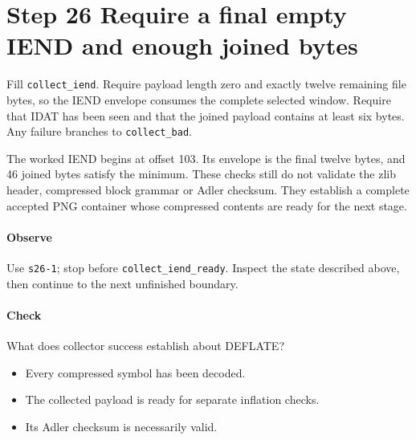 \section{Step 26 Require a final empty IEND and enough joined bytes}\label{png-collect-s26}
Fill \texttt{collect\_iend}. Require payload length zero and exactly twelve remaining file bytes, so the IEND envelope consumes the complete selected window. Require that IDAT has been seen and that the joined payload contains at least six bytes. Any failure branches to \texttt{collect\_bad}.

The worked IEND begins at offset 103. Its envelope is the final twelve bytes, and 46 joined bytes satisfy the minimum. These checks still do not validate the zlib header, compressed block grammar or Adler checksum. They establish a complete accepted PNG container whose compressed contents are ready for the next stage.

\paragraph{Observe} Use \texttt{s26-1}; stop before \texttt{collect\_iend\_ready}. Inspect the state described above, then continue to the next unfinished boundary.

\paragraph{Check} What does collector success establish about DEFLATE?
\begin{itemize}
  \item[A.] Every compressed symbol has been decoded.
  \item[B.] The collected payload is ready for separate inflation checks.
  \item[C.] Its Adler checksum is necessarily valid.
\end{itemize}
